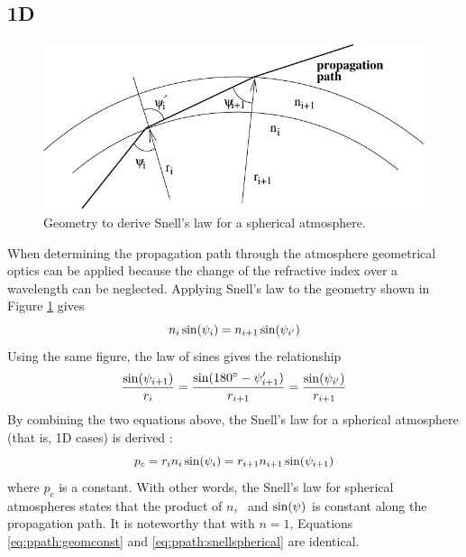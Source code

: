 \subsection{1D}
\label{sec:ppath:refr1D}
\begin{figure}[tb!]
  \begin{center}
    \includegraphics*{snell}
    \caption{Geometry to derive Snell's law for a spherical atmosphere. }
    \label{fig:ppath:snell} 
  \end{center} 
\end{figure}

When determining the propagation path through the atmosphere
geometrical optics can be applied because the change of the refractive
index over a wavelength can be neglected. Applying Snell's law
to the geometry shown in Figure
\ref{fig:ppath:snell} gives
\begin{equation}
  n_i \sin (\psi_{i}) = n_{i+1} \sin (\psi_{i'})
\end{equation}
Using the same figure, the law of sines gives the relationship
\begin{equation}
  \frac{\sin(\psi_{i+1})}{r_{i}} = 
  \frac{\sin(180^\circ-\psi_{i+1}')}{r_{i+1}} =
  \frac{\sin(\psi_{i'})}{r_{i+1}} 
\end{equation}
By combining the two equations above, the Snell's law for a spherical
atmosphere (that is, 1D cases) is derived
\citep[e.g.][]{kyle:91,balluch:97}:
\begin{equation}
  p_c = r_{i} n_i \sin(\psi_{i}) = r_{i+1} n_{i+1}\sin(\psi_{i+1}) 
 \label{eq:ppath:snellspherical}
\end{equation}
where $p_c$ is a constant. With other words, the Snell's law for
spherical atmospheres states that the product of $n$, \Rds\ and
$\sin(\psi)$ is constant along the propagation path. It is
noteworthy that with $n=1$, Equations \ref{eq:ppath:geomconst} and
\ref{eq:ppath:snellspherical} are identical.


